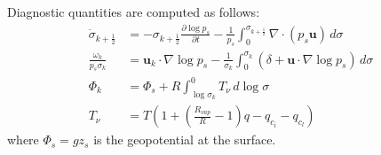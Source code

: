 Diagnostic quantities are computed as follows:
\begin{align}
    \dot\sigma_{k + \frac{1}{2}} &= -\sigma_{k + \frac{1}{2}}\frac{\partial\log p_s}{\partial t} -\frac{1}{p_s}\int_0^{\sigma_{k + \frac{1}{2}}} \nabla\cdot(p_s\mathbf u)\, d\sigma \\
\frac{\omega_k}{p_s\sigma_k}
&= \mathbf u_k\cdot\nabla \log p_s
-\frac{1}{\sigma_k}\int_0^{\sigma_k}\left(\delta + \mathbf u\cdot\nabla\log p_s \right)\,d\sigma \\
    \Phi_k &= \Phi_{s} + R\int_{\log \sigma_k}^{0} T_{\nu}\,d\log\sigma \label{apx:eq:diagnostic_variables} \\
    T_{\nu} &= T(1 + \left(\frac{R_{vap}}{R} - 1 \right)q - q_{c_{i}} - q_{c_{l}})
\end{align}
where $\Phi_{s}=gz_{s}$ is the geopotential at the surface.
